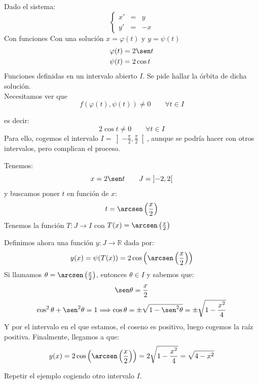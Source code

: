 \begin{ejemplo}
    Dado el sistema:
    \begin{equation*}
        \left\{\begin{array}{rcl}
                x' &=& y \\
                y' &=& -x
        \end{array}\right.
    \end{equation*}
    Con funciones
    Con una solución $x = \varphi(t)$ y $y=\psi(t)$
    \begin{align*}
        \varphi(t) &= 2\sen t \\
        \psi(t) &= 2\cos t \\
    \end{align*}
    Funciones definidas en un intervalo abierto $I$. Se pide hallar la órbita de dicha solución.\\
    Necesitamos ver que
    \begin{equation*}
        f(\varphi(t),\psi(t)) \neq 0 \qquad \forall t\in I
    \end{equation*}

    es decir:
    \begin{equation*}
        2\cos t \neq 0 \qquad \forall t\in I
    \end{equation*}
    Para ello, cogemos el intervalo $I = \left]-\frac{\pi}{2}, \frac{\pi}{2}\right[$, aunque se podría hacer con otros intervalos, pero complican el proceso.

    Tenemos:
    \begin{equation*}
        x=2\sen t \qquad J=\left]-2,2\right[
    \end{equation*}
    y buscamos poner $t$ en función de $x$:
    \begin{equation*}
        t = \arcsen \left(\dfrac{x}{2}\right)
    \end{equation*}
    Tenemos la función $T:J\rightarrow I$ con $T(x) = \arcsen \left(\frac{x}{2}\right)$

    Definimos ahora una función $y:J\rightarrow \mathbb{R}$ dada por:
    \begin{equation*}
        y(x) = \psi(T(x)) = 2\cos\left(\arcsen\left(\dfrac{x}{2}\right)\right)
    \end{equation*}
    Si llamamos $\theta = \arcsen\left(\frac{x}{2}\right)$, entonces $\theta \in I$ y sabemos que:
    \begin{gather*}
        \sen \theta = \dfrac{x}{2}\\
        \cos^2 \theta + \sen^2 \theta = 1 \Longrightarrow \cos \theta = \pm \sqrt{1-\sen^2 \theta} = \pm \sqrt{1-\dfrac{x^2}{4}}
    \end{gather*}
    Y por el intervalo en el que estamos, el coseno es positivo, luego cogemos la raíz positiva. Finalmente, llegamos a que:
    \begin{equation*}
        y(x) = 2\cos\left(\arcsen\left(\dfrac{x}{2}\right)\right) = 2\sqrt{1-\dfrac{x^2}{4}} = \sqrt{4-x^2}
    \end{equation*}
\end{ejemplo}

\begin{ejercicio}
    Repetir el ejemplo cogiendo otro intervalo $I$.
\end{ejercicio}
